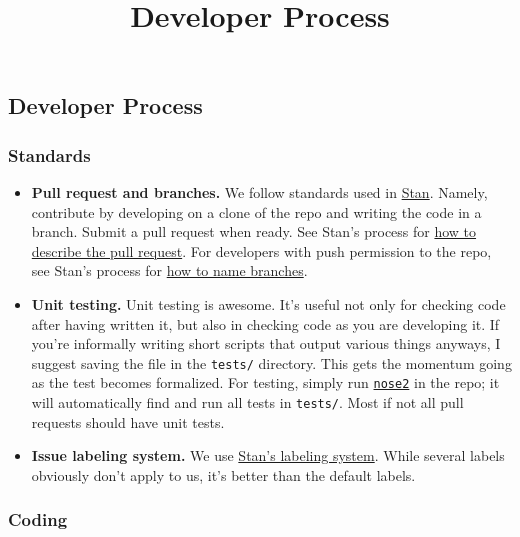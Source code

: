 \title{Developer Process}

\subsection{Developer Process}

\subsubsection{Standards}

\begin{itemize}
\item
  \textbf{Pull request and branches.} We follow standards used in 
  \href{http://mc-stan.org/}{Stan}.
  Namely, contribute by developing on a clone of the repo and writing
  the code in a branch. Submit a pull request when ready. See Stan's
  process for
  \href{https://github.com/stan-dev/stan/wiki/Developer-Process\#information-to-include-in-pull-request}{how
  to describe the pull request}. For developers with push permission to
  the repo, see Stan's process for
  \href{https://github.com/stan-dev/stan/wiki/Developer-Process\#4--how-to-contribute-with-a-clone-of-the-repository}{how
  to name branches}.
\item
  \textbf{Unit testing.} Unit testing is awesome. It's useful not only
  for checking code after having written it, but also in checking code
  as you are developing it. If you're informally writing short scripts
  that output various things anyways, I suggest saving the file in the
  \texttt{tests/} directory. This gets the momentum going as the test
  becomes formalized. For testing, simply run
  \href{http://nose2.readthedocs.io/en/latest/getting_started.html}{\texttt{nose2}}
  in the repo; it will automatically find and run all tests in
  \texttt{tests/}. Most if not all pull requests should have unit tests.
\item
  \textbf{Issue labeling system.} We use
  \href{https://github.com/stan-dev/stan/pulls}{Stan's labeling system}.
  While several labels obviously don't apply to us, it's better than the
  default labels.
\end{itemize}

\subsubsection{Coding}

